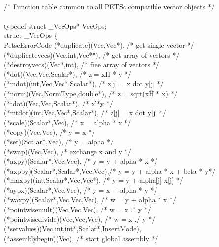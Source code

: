 \documentclass[twoside,12pt]{../sty/report_petsc}
\begin{document}
\begin{tabbing}
\\
/* Function table common to all PETSc compatible vector objects */\\
\\
typedef struct \_VecOps* VecOps;\\
struct \_VecOps \{\\
  PetscErrorCode  (*duplicate)(Vec,Vec*),           /* get single vector */\\
       (*duplicatevecs)(Vec,int,Vec**),  /* get array of vectors */\\
       (*destroyvecs)(Vec*,int),         /* free array of vectors */\\
       (*dot)(Vec,Vec,Scalar*),          /* z = x\^H * y */\\
       (*mdot)(int,Vec,Vec*,Scalar*),    /* z[j] = x dot y[j] */\\
       (*norm)(Vec,NormType,double*),    /* z = sqrt(x\^H * x) */\\
       (*tdot)(Vec,Vec,Scalar*),         /* x'*y */\\
       (*mtdot)(int,Vec,Vec*,Scalar*),   /* z[j] = x dot y[j] */\\
       (*scale)(Scalar*,Vec),            /* x = alpha * x   */\\
       (*copy)(Vec,Vec),                 /* y = x */\\
       (*set)(Scalar*,Vec),              /* y = alpha  */\\
       (*swap)(Vec,Vec),                 /* exchange x and y */\\
       (*axpy)(Scalar*,Vec,Vec),         /* y = y + alpha * x */\\
       (*axpby)(Scalar*,Scalar*,Vec,Vec),/* y = y + alpha * x + beta * y*/\\
       (*maxpy)(int,Scalar*,Vec,Vec*),   /* y = y + alpha[j] x[j] */\\
       (*aypx)(Scalar*,Vec,Vec),         /* y = x + alpha * y */\\
       (*waxpy)(Scalar*,Vec,Vec,Vec),    /* w = y + alpha * x */\\
       (*pointwisemult)(Vec,Vec,Vec),    /* w = x .* y */\\
       (*pointwisedivide)(Vec,Vec,Vec),  /* w = x ./ y */\\
       (*setvalues)(Vec,int,int*,Scalar*,InsertMode),\\
       (*assemblybegin)(Vec),            /* start global assembly */\\

\end{tabbing}
\end{document}
